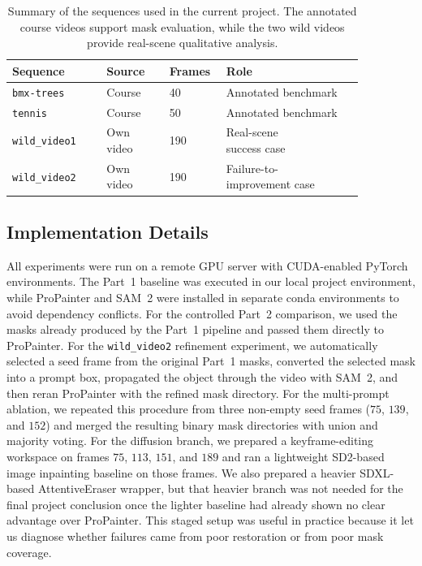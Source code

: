 \documentclass[10pt,twocolumn,letterpaper]{article}
\begin{document}
\begin{table}[t]
  \centering
  \small
  \setlength{\tabcolsep}{4pt}
  \begin{tabular}{@{}p{0.24\linewidth}p{0.16\linewidth}p{0.11\linewidth}p{0.35\linewidth}@{}}
    \toprule
    Sequence & Source & Frames & Role \\
    \midrule
    \texttt{bmx-trees} & Course & 40 & Annotated benchmark \\
    \texttt{tennis} & Course & 50 & Annotated benchmark \\
    \texttt{wild\_video1} & Own video & 190 & \shortstack[l]{Real-scene\\success case} \\
    \texttt{wild\_video2} & Own video & 190 & \shortstack[l]{Failure-to-\\improvement case} \\
    \bottomrule
  \end{tabular}
  \caption{Summary of the sequences used in the current project. The annotated course videos support mask evaluation, while the two wild videos provide real-scene qualitative analysis.}
  \label{tab:dataset-summary}
\end{table}

\subsection{Implementation Details}
All experiments were run on a remote GPU server with CUDA-enabled PyTorch environments.
The Part~1 baseline was executed in our local project environment, while ProPainter and SAM~2 were installed in separate conda environments to avoid dependency conflicts.
For the controlled Part~2 comparison, we used the masks already produced by the Part~1 pipeline and passed them directly to ProPainter.
For the \texttt{wild\_video2} refinement experiment, we automatically selected a seed frame from the original Part~1 masks, converted the selected mask into a prompt box, propagated the object through the video with SAM~2, and then reran ProPainter with the refined mask directory.
For the multi-prompt ablation, we repeated this procedure from three non-empty seed frames ($75$, $139$, and $152$) and merged the resulting binary mask directories with union and majority voting.
For the diffusion branch, we prepared a keyframe-editing workspace on frames $75$, $113$, $151$, and $189$ and ran a lightweight SD2-based image inpainting baseline on those frames.
We also prepared a heavier SDXL-based AttentiveEraser wrapper, but that heavier branch was not needed for the final project conclusion once the lighter baseline had already shown no clear advantage over ProPainter.
This staged setup was useful in practice because it let us diagnose whether failures came from poor restoration or from poor mask coverage.
\end{document}
